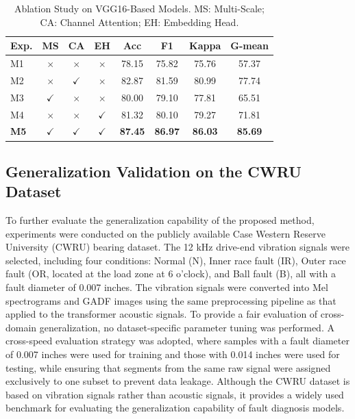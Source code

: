 \documentclass[anonymous]{iopjournal}
\begin{document}
\begin{table}
	\centering
	\caption{Ablation Study on VGG16-Based Models. MS: Multi-Scale; CA: Channel Attention; EH: Embedding Head.}
	\label{tab:ablation_vgg16}
	\renewcommand{\arraystretch}{1.2}
	\small
		\begin{tabular}{lccccccc}
			\hline
			\textbf{Exp.} & \textbf{MS} & \textbf{CA} & \textbf{EH} & \textbf{Acc} & \textbf{F1} & \textbf{Kappa} & \textbf{G-mean} \\
			\hline
			M1 & $\times$ & $\times$ & $\times$ & 78.15 & 75.82 & 75.76 & 57.37 \\
			M2 & $\times$ & $\checkmark$ & $\times$ & 82.87 & 81.59 & 80.99 & 77.74 \\
			M3 & $\checkmark$ &$\times$ & $\times$ & 80.00 & 79.10 & 77.81 & 65.51 \\
			M4 & $\times$ & $\times$ & $\checkmark$ & 81.32 & 80.10 & 79.27 & 71.81 \\
			\textbf{M5} & $\checkmark$ & $\checkmark$ & $\checkmark$ & \textbf{87.45} & \textbf{86.97} & \textbf{86.03} & \textbf{85.69} \\
			\hline
		\end{tabular}
\end{table}

\subsection{Generalization Validation on the CWRU Dataset}
To further evaluate the generalization capability of the proposed method, experiments were conducted on the publicly available Case Western Reserve University (CWRU) bearing dataset. The 12 kHz drive-end vibration signals were selected, including four conditions: Normal (N), Inner race fault (IR), Outer race fault (OR, located at the load zone at 6 o’clock), and Ball fault (B), all with a fault diameter of 0.007 inches. The vibration signals were converted into Mel spectrograms and GADF images using the same preprocessing pipeline as that applied to the transformer acoustic signals. To provide a fair evaluation of cross-domain generalization, no dataset-specific parameter tuning was performed. A cross-speed evaluation strategy was adopted, where samples with a fault diameter of 0.007 inches were used for training and those with 0.014 inches were used for testing, while ensuring that segments from the same raw signal were assigned exclusively to one subset to prevent data leakage. Although the CWRU dataset is based on vibration signals rather than acoustic signals, it provides a widely used benchmark for evaluating the generalization capability of fault diagnosis models.
\end{document}
